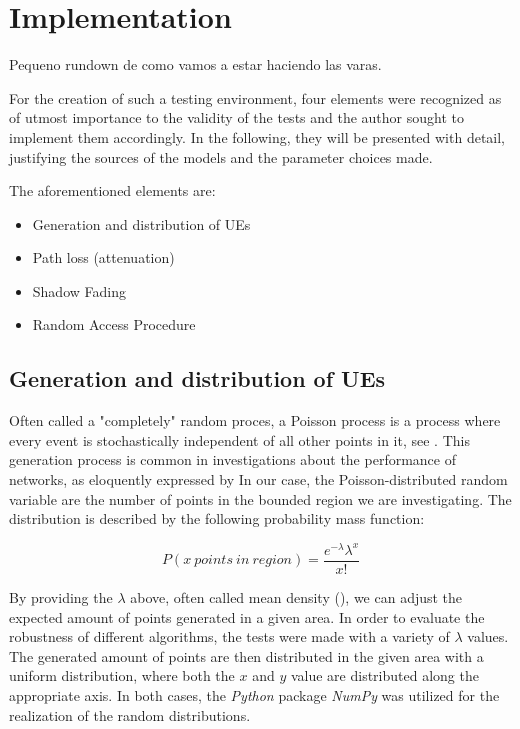 \chapter{Implementation} \label{Implementation}

Pequeno rundown de como vamos a estar haciendo las varas.

For the creation of such a testing environment, four elements were recognized as of utmost importance to the validity of the tests and the author sought to implement them accordingly. In the following, they will be presented with detail, justifying the sources of the models and the parameter choices made.

The aforementioned elements are:

\begin{itemize}
	\item Generation and distribution of UEs
	\item Path loss (attenuation)
	\item Shadow Fading
	\item Random Access Procedure
\end{itemize}

\section{Generation and distribution of UEs} \label{PPP}
Often called a "completely" random proces, a Poisson process is a process where every event is stochastically independent of all other points in it, see \cite{Keeler2016}. This generation process is common in investigations about the performance of networks, as eloquently expressed by \cite{Keeler} In our case, the Poisson-distributed random variable are the number of points in the bounded region we are investigating. The distribution is described by the following probability mass function:

\begin{equation} \label{eq:Poisson}
P\left( x\ points\ in\ region \right) = \frac{{e^{ - \lambda } \lambda ^x }}{{x!}}
\end{equation}

By providing the $\lambda$ above, often called mean density (\cite{Keeler2016}), we can adjust the expected amount of points generated in a given area. In order to evaluate the robustness of different algorithms, the tests were made with a variety of $\lambda$ values. The generated amount of points are then distributed in the given area with a uniform distribution, where both the $x$ and $y$ value are distributed along the appropriate axis. In both cases, the \textit{Python} package \textit{NumPy} was utilized for the realization of the random distributions.

